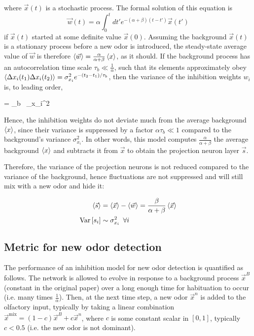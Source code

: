 where $\vec{x}(t)$ is a stochastic process. The formal solution of this equation is 
\begin{equation*}
	\vec{w}(t) = \alpha \int_0^t dt' e^{-(\alpha + \beta) (t - t')} \vec{x}(t')
\end{equation*} 
if $\vec{x}(t)$ started at some definite value $\vec{x}(0)$. Assuming the background $\vec{x}(t)$ is a stationary process before a new odor is introduced, the steady-state average value of $\vec{w}$ is therefore $\braket{\vec{w}} = \frac{\alpha}{\alpha + \beta} \braket{x}$, as it should. If the background process has an autocorrelation time scale $\tau_b \ll \frac{1}{\alpha}$, such that its elements approximately obey $\braket{\Delta x_i(t_1) \Delta x_i(t_2)} = \sigma_{x_i}^2 e^{-(t_2 - t_1)/\tau_b}$, then the variance of the inhibition weights $w_i$ is, to leading order, 

\beq 
	 = \alpha \tau_b \, \frac{\alpha}{\alpha + \beta}  \sigma_{x_i}^2
\eeq

Hence, the inhibition weights do not deviate much from the average background $\braket{x}$, since their variance is suppressed by a factor $\alpha \tau_b \ll 1$ compared to the background's variance $\sigma_{x_i}^2$. In other words, this model computes $\frac{\alpha}{\alpha + \beta}$ the average background $\braket{x}$ and subtracts it from $\vec{x}$ to obtain the projection neuron layer $\vec{s}$. 

Therefore, the variance of the projection neurons is not reduced compared to the variance of the background, hence fluctuations are not suppressed and will still mix with a new odor and hide it:

\begin{align}
	\braket{\vec{s}} &= \braket{\vec{x}} - \braket{\vec{w}} = \frac{\beta}{\alpha + \beta} \braket{\vec{x}} \\
	\mathrm{Var}\left[ s_i \right] &\sim \sigma_{x_i}^2 \,\,\, \forall i
\end{align}

\subsection{Metric for new odor detection}
\label{subsect:metric_new_odor}
The performance of an inhibition model for new odor detection is quantified as follows. The network is allowed to evolve in response to a background process $\vec{x}^B$ (constant in the original paper) over a long enough time for habituation to occur (i.e. many times $\frac{1}{\alpha}$). Then, at the next time step, a new odor $\vec{x}^n$ is added to the olfactory input, typically by taking a linear combination $\vec{x}^{\mathrm{mix}} = (1-c) \vec{x}^B + c\vec{x}^n$, where $c$ is some constant scalar in $[0, 1]$, typically $c < 0.5$ (i.e. the new odor is not dominant). 

